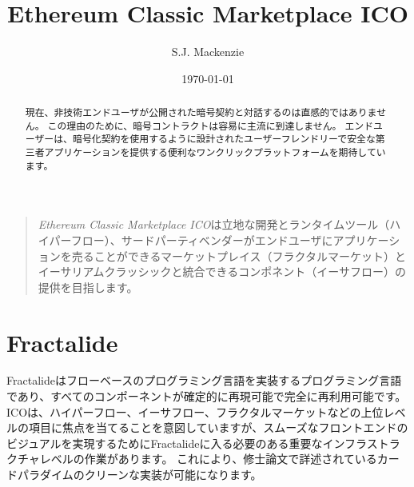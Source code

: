 \documentclass[%
 aip,
 jmp,
 amsmath,amssymb,
 preprint,
 reprint,
 author-year,
 author-numerical,
]{revtex4-1}
\begin{document}
\begin{CJK}{UTF8}{ipxm}


\title[Ethereum Classic Marketplace ICO]{Ethereum Classic Marketplace ICO}%


\author{S.J. Mackenzie}%

\date{\today}%

\begin{abstract}

現在、非技術エンドユーザが公開された暗号契約と対話するのは直感的ではありません。 この理由のために、暗号コントラクトは容易に主流に到達しません。
エンドユーザーは、暗号化契約を使用するように設計されたユーザーフレンドリーで安全な第三者アプリケーションを提供する便利なワンクリックプラットフォームを期待しています。
\end{abstract}

\maketitle

\begin{quotation}
\textit{Ethereum Classic Marketplace ICO}は立地な開発とランタイムツール（ハイパーフロー）、サードパーティベンダーがエンドユーザにアプリケーションを売ることができるマーケットプレイス（フラクタルマーケット）とイーサリアムクラッシックと統合できるコンポネント（イーサフロー）の提供を目指します。

\end{quotation}

\section{\label{sec:fractalide}Fractalide}
Fractalideはフローベースのプログラミング言語を実装するプログラミング言語であり、すべてのコンポーネントが確定的に再現可能で完全に再利用可能です。 ICOは、ハイパーフロー、イーサフロー、フラクタルマーケットなどの上位レベルの項目に焦点を当てることを意図していますが、スムーズなフロントエンドのビジュアルを実現するためにFractalideに入る必要のある重要なインフラストラクチャレベルの作業があります。 これにより、修士論文で詳述されているカードパラダイムのクリーンな実装が可能になります。


\end{CJK}
\end{document}
